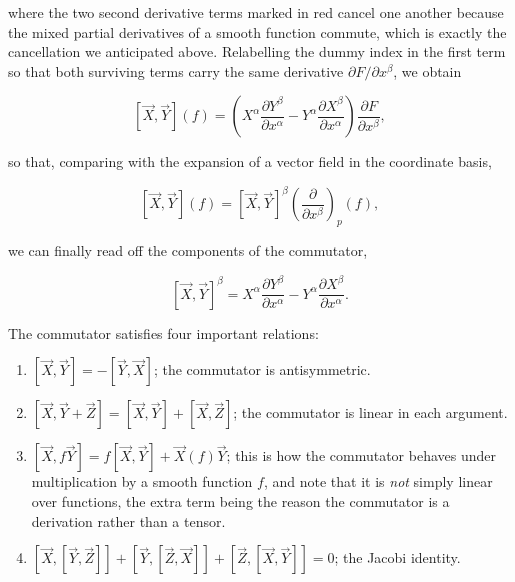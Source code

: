         where the two second derivative terms marked in red cancel one another because the mixed partial derivatives of a smooth function commute, which is exactly the cancellation we anticipated above. Relabelling the dummy index in the first term so that both surviving terms carry the same derivative $\partial F/\partial x^{\beta}$, we obtain

        \begin{equation}
            \left[\Vec{X},\Vec{Y}\right](f) = \left(X^{\alpha}\frac{\partial Y^{\beta}}{\partial x^{\alpha}} - Y^{\alpha}\frac{\partial X^{\beta}}{\partial x^{\alpha}}\right)\frac{\partial F}{\partial x^{\beta}},
        \end{equation}

        so that, comparing with the expansion of a vector field in the coordinate basis,

        \begin{equation}
            \left[\Vec{X},\Vec{Y}\right](f) = \left[\Vec{X},\Vec{Y}\right]^{\beta}\left( \frac{\partial}{\partial x^{\beta}}\right)_p(f),
        \end{equation}

        we can finally read off the components of the commutator,

        \begin{equation}\label{eq:CommutatorComponents}
            \left[\Vec{X},\Vec{Y}\right]^{\beta} = X^{\alpha}\frac{\partial Y^{\beta}}{\partial x^{\alpha}} - Y^{\alpha}\frac{\partial X^{\beta}}{\partial x^{\alpha}}.
        \end{equation}

        The commutator satisfies four important relations:

        \begin{enumerate}
            \item $\left[\Vec{X},\Vec{Y}\right] = - \left[\Vec{Y},\Vec{X}\right]$; the commutator is antisymmetric.

            \item $\left[\Vec{X},\Vec{Y} + \Vec{Z}\right] = \left[\Vec{X},\Vec{Y}\right] + \left[\Vec{X},\Vec{Z}\right]$; the commutator is linear in each argument.

            \item $\left[\Vec{X},f\Vec{Y}\right] = f \left[\Vec{X},\Vec{Y}\right] + \Vec{X}(f)\Vec{Y}$; this is how the commutator behaves under multiplication by a smooth function $f$, and note that it is \textit{not} simply linear over functions, the extra term being the reason the commutator is a derivation rather than a tensor.

            \item $\left[\Vec{X},\left[\Vec{Y},\Vec{Z}\right]\right] + \left[\Vec{Y},\left[\Vec{Z},\Vec{X}\right]\right] + \left[\Vec{Z},\left[\Vec{X},\Vec{Y}\right]\right] = 0$; the Jacobi identity.
        \end{enumerate}

